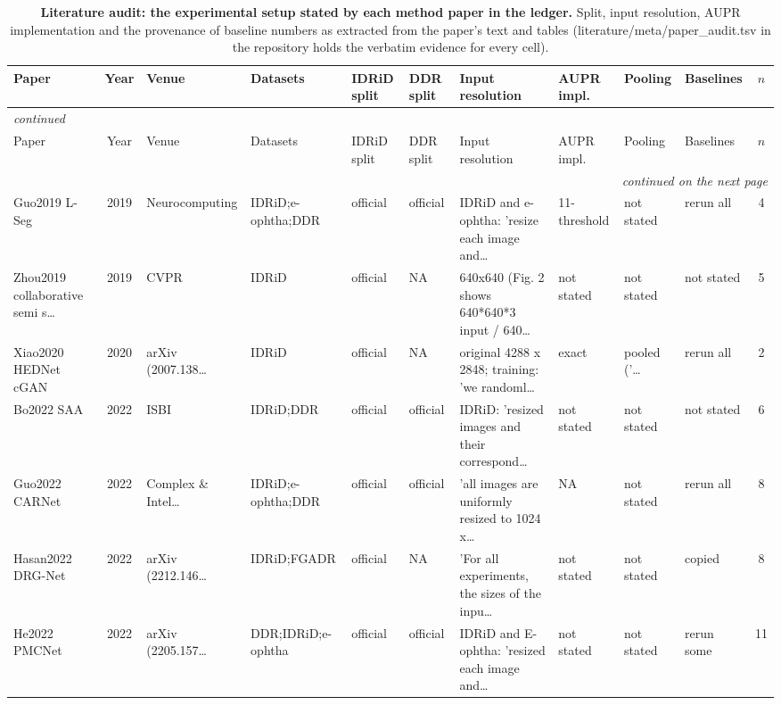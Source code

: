 \begin{landscape}
{\scriptsize\setlength{\tabcolsep}{3.2pt}\setlength{\LTcapwidth}{\textwidth}\renewcommand{\arraystretch}{1.08}
\begin{longtable}{p{34mm} c p{20mm} p{24mm} p{14mm} p{14mm} p{48mm} p{18mm} p{14mm} p{16mm} c}
\caption{\textbf{Literature audit: the experimental setup stated by each method paper in the ledger.} Split, input resolution, AUPR implementation and the provenance of baseline numbers as extracted from the paper's text and tables (literature/meta/paper\_audit.tsv in the repository holds the verbatim evidence for every cell).}\label{stab:literature}\\
\toprule
Paper & Year & Venue & Datasets & IDRiD split & DDR split & Input resolution & AUPR impl. & Pooling & Baselines & $n$ \\
\midrule
\endfirsthead
\multicolumn{11}{l}{\textit{continued}}\\
\toprule
Paper & Year & Venue & Datasets & IDRiD split & DDR split & Input resolution & AUPR impl. & Pooling & Baselines & $n$ \\
\midrule
\endhead
\midrule
\multicolumn{11}{r}{\textit{continued on the next page}}\\
\endfoot
\bottomrule
\endlastfoot
Guo2019 L-Seg & 2019 & Neurocomputing & IDRiD;e-ophtha;DDR & official & official & IDRiD and e-ophtha: 'resize each image and… & 11-threshold & not stated & rerun all & 4 \\
Zhou2019 collaborative semi s… & 2019 & CVPR & IDRiD & official & NA & 640x640 (Fig. 2 shows 640*640*3 input / 640… & not stated & not stated & not stated & 5 \\
Xiao2020 HEDNet cGAN & 2020 & arXiv (2007.138… & IDRiD & official & NA & original 4288 x 2848; training: 'we randoml… & exact & pooled ('… & rerun all & 2 \\
Bo2022 SAA & 2022 & ISBI & IDRiD;DDR & official & official & IDRiD: 'resized images and their correspond… & not stated & not stated & not stated & 6 \\
Guo2022 CARNet & 2022 & Complex \& Intel… & IDRiD;e-ophtha;DDR & official & official & 'all images are uniformly resized to 1024 x… & NA & not stated & rerun all & 8 \\
Hasan2022 DRG-Net & 2022 & arXiv (2212.146… & IDRiD;FGADR & official & NA & 'For all experiments, the sizes of the inpu… & not stated & not stated & copied & 8 \\
He2022 PMCNet & 2022 & arXiv (2205.157… & DDR;IDRiD;e-ophtha & official & official & IDRiD and E-ophtha: 'resized each image and… & not stated & not stated & rerun some & 11 \\

\end{longtable}}
\end{landscape}
